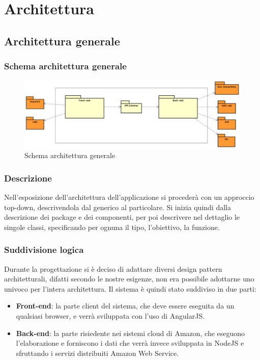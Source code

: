 \documentclass[../ManualeSviluppatore_v1.0.0.tex]{subfiles}
\begin{document}
\section{Architettura}

	\subsection{Architettura generale}
		\subsubsection{Schema architettura generale}
			\begin{figure}[!h]
				\centering
				\includegraphics[width=\textwidth]{Architettura/AltoLivello.png}
				\caption{Schema architettura generale}
			\end{figure}

		\subsubsection{Descrizione}
		Nell'esposizione dell'architettura dell'applicazione si procederà con un approccio \gls{top-down}, descrivendola dal generico al particolare. Si inizia quindi dalla descrizione dei package e dei componenti, per poi descrivere nel dettaglio le singole classi, specificando per ognuna il tipo, l'obiettivo, la funzione.

		\subsubsection{Suddivisione logica}
			Durante la progettazione si è deciso di adattare diversi \gls{design pattern architetturali},
			difatti secondo le nostre esigenze, non era possibile adottarne uno univoco per l'intera architettura.
			Il sistema è quindi stato suddiviso in due parti:
			\begin{itemize}
				\item \textbf{Front-end}: la parte client del sistema, che deve essere eseguita da un qualsiasi browser, e verrà sviluppata con l'uso di AngularJS.
				\item \textbf{Back-end}: la parte risiedente nei sistemi cloud di Amazon, che eseguono l'elaborazione e forniscono i dati che verrà invece sviluppata in NodeJS e sfruttando i servizi distribuiti Amazon Web Service.
			\end{itemize}
\end{document}
